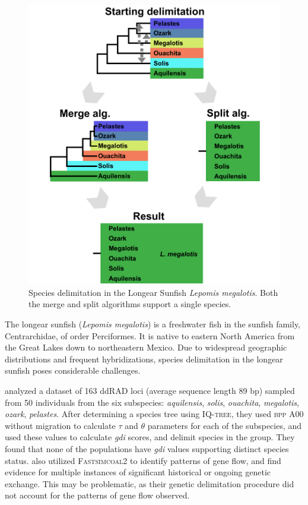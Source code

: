 \documentclass[A4]{article1}
\begin{document}
\begin{figure}[t]
    \includegraphics[scale=0.2]{figs/fig-longear-fish-results}
    
    \caption{Species delimitation in the Longear Sunfish \textit{Lepomis megalotis}.
        Both the merge and split algorithms support a single species. %
    } \label{fig:longear-fish}
\end{figure}

The longear sunfish (\textit{Lepomis megalotis}) is a freshwater fish in the sunfish
family, Centrarchidae, of order Perciformes.  It is native to eastern North America from
the Great Lakes down to northeastern Mexico.  Due to widespread geographic distributions
and frequent hybridizations, species delimitation in the longear sunfish poses
considerable challenges. 

\citet{Kim2022} analyzed a dataset of 163 ddRAD loci (average
sequence length 89 bp) sampled from 50 individuals from the six subspecies:
\textit{aquilensis}, \textit{solis}, \textit{ouachita}, \textit{megalotis},
\textit{ozark}, \textit{pelastes}.  After determining a species tree using
\textsc{IQ-tree}, they used \textsc{bpp} A00 without migration to calculate $\tau$ and
$\theta$ parameters for each of the subspecies, and used these values to calculate
\textit{gdi} scores, and delimit species in the group. They found that none of the populations have \textit{gdi} values supporting distinct species status. \citet{Kim2022} also utilized \textsc{Fastsimcoal2} to identify patterns
of gene flow, and find evidence for multiple instances of significant historical or
ongoing genetic exchange.  This may be problematic, as their genetic delimitation procedure
did not account for the patterns of gene flow observed.
\end{document}
